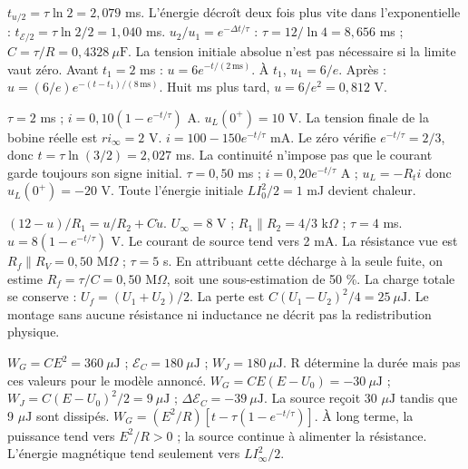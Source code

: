 $t_{u/2}=\tau\ln2=2{,}079$ ms. L’énergie décroît deux fois plus vite dans l’exponentielle : $t_{\mathcal E/2}=\tau\ln2/2=1{,}040$ ms.
$u_2/u_1=e^{-\Delta t/\tau}$ : $\tau=12/\ln4=8{,}656$ ms ; $C=\tau/R=0{,}4328\ \mu\mathrm{ F}$. La tension initiale absolue n’est pas nécessaire si la limite vaut zéro.
Avant $t_1=2$ ms : $u=6e^{-t/(2\,\mathrm{ms})}$. À $t_1$, $u_1=6/e$. Après : $u=(6/e)e^{-(t-t_1)/(8\,\mathrm{ms})}$. Huit ms plus tard, $u=6/e^2=0{,}812$ V.


$\tau=2$ ms ; $i=0{,}10(1-e^{-t/\tau})$ A. $u_L(0^+)=10$ V. La tension finale de la bobine réelle est $ri_\infty=2$ V.
$i=100-150e^{-t/\tau}$ mA. Le zéro vérifie $e^{-t/\tau}=2/3$, donc $t=\tau\ln(3/2)=2{,}027$ ms. La continuité n’impose pas que le courant garde toujours son signe initial.
$\tau=0{,}50$ ms ; $i=0{,}20e^{-t/\tau}$ A ; $u_L=-R_ti$ donc $u_L(0^+)=-20$ V. Toute l’énergie initiale $LI_0^2/2=1$ mJ devient chaleur.


$(12-u)/R_1=u/R_2+C\dot u$. $U_\infty=8$ V ; $R_1\parallel R_2=4/3$ k$\Omega$ ; $\tau=4$ ms. $u=8(1-e^{-t/\tau})$ V. Le courant de source tend vers 2 mA.
La résistance vue est $R_f\parallel R_V=0{,}50$ M$\Omega$ ; $\tau=5$ s. En attribuant cette décharge à la seule fuite, on estime $R_f=\tau/C=0{,}50$ M$\Omega$, soit une sous-estimation de 50 \%.
La charge totale se conserve : $U_f=(U_1+U_2)/2$. La perte est $C(U_1-U_2)^2/4=25\ \mu\mathrm{ J}$. Le montage sans aucune résistance ni inductance ne décrit pas la redistribution physique.


$W_G=CE^2=360\ \mu\mathrm{ J}$ ; $\mathcal E_C=180\ \mu\mathrm{ J}$ ; $W_J=180\ \mu\mathrm{ J}$. R détermine la durée mais pas ces valeurs pour le modèle annoncé.
$W_G=CE(E-U_0)=-30\ \mu\mathrm{ J}$ ; $W_J=C(E-U_0)^2/2=9\ \mu\mathrm{ J}$ ; $\Delta\mathcal E_C=-39\ \mu\mathrm{ J}$. La source reçoit 30 $\mu\mathrm{ J}$ tandis que 9 $\mu\mathrm{ J}$ sont dissipés.
$W_G=(E^2/R)[t-\tau(1-e^{-t/\tau})]$. À long terme, la puissance tend vers $E^2/R>0$ ; la source continue à alimenter la résistance. L’énergie magnétique tend seulement vers $LI_\infty^2/2$.


